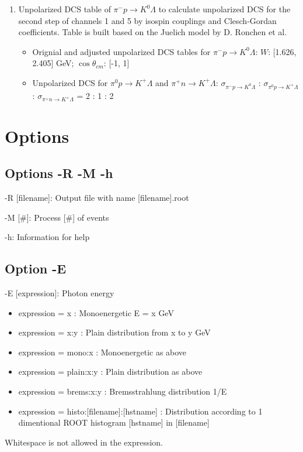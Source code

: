 \documentclass[a4paper]{article}
\begin{document}
\begin{enumerate}
\begin{itemize}
  \end{itemize}

\item Unpolarized DCS table of $\pi^- p\rightarrow K^0\Lambda$ to calculate unpolarized DCS for the second step of channels 1 and 5 by isospin couplings and Clesch-Gordan coefficients. Table is built based on the Juelich model by D. Ronchen et al.
 \begin{itemize}
  \item Orignial and adjusted unpolarized DCS tables for $\pi^- p\rightarrow K^0\Lambda$: $W$: [1.626, 2.405] GeV; $\cos\theta_{cm}$: [-1, 1]
  \item Unpolarized DCS for $\pi^0 p\rightarrow K^+\Lambda$ and $\pi^+ n\rightarrow K^+\Lambda$: $\sigma_{\pi^- p\rightarrow K^0\Lambda}$ : $\sigma_{\pi^0 p\rightarrow K^+\Lambda}$ : $\sigma_{\pi^+ n\rightarrow K^+\Lambda}$ = 2 : 1 : 2
  \end{itemize}

\end{enumerate}

\section{Options}
\subsection{Options -R -M -h}
	-R [filename]: Output file with name [filename].root

	-M [\#]: Process  [\#] of events

	-h: Information for help

\subsection{Option -E}
	-E [expression]: Photon energy

         \begin{itemize}
	\item expression = x :          	Monoenergetic E = x GeV
	\item expression = x:y :       	Plain distribution from x to y GeV
	\item expression = mono:x :      	Monoenergetic as above
	\item expression = plain:x:y : 	Plain distribution as above
	\item expression = brems:x:y : 	Bremsstrahlung distribution 1/E
	\item expression = histo:[filename]:[hstname] :	Distribution according to 1 dimentional ROOT histogram [hstname] in [filename]
        \end{itemize}
         Whitespace is not allowed in the expression.
\end{document}
